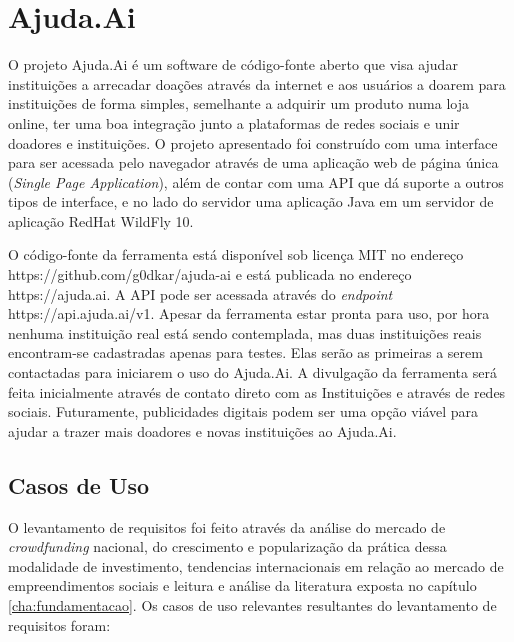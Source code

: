 \chapter{Ajuda.Ai} \label{cha:ajudaai}

O projeto Ajuda.Ai é um software de código-fonte aberto que visa ajudar instituições a arrecadar doações através da internet e aos usuários a doarem para instituições de forma simples, semelhante a adquirir um produto numa loja online, ter uma boa integração junto a plataformas de redes sociais e unir doadores e instituições. O projeto apresentado foi construído com uma interface para ser acessada pelo navegador através de uma aplicação web de página única (\emph{Single Page Application}), além de contar com uma API que dá suporte a outros tipos de interface, e no lado do servidor uma aplicação Java em um servidor de aplicação RedHat WildFly 10.

O código-fonte da ferramenta está disponível sob licença MIT no endereço \\ https://github.com/g0dkar/ajuda-ai e está publicada no endereço https://ajuda.ai. A API pode ser acessada através do \emph{endpoint} https://api.ajuda.ai/v1. Apesar da ferramenta estar pronta para uso, por hora nenhuma instituição real está sendo contemplada, mas duas instituições reais encontram-se cadastradas apenas para testes. Elas serão as primeiras a serem contactadas para iniciarem o uso do Ajuda.Ai. A divulgação da ferramenta será feita inicialmente através de contato direto com as Instituições e através de redes sociais. Futuramente, publicidades digitais podem ser uma opção viável para ajudar a trazer mais doadores e novas instituições ao Ajuda.Ai.





\section{Casos de Uso} \label{sec:ajudaai:casos}

O levantamento de requisitos foi feito através da análise do mercado de \emph{crowdfunding} nacional, do crescimento e popularização da prática dessa modalidade de investimento, tendencias internacionais em relação ao mercado de empreendimentos sociais e leitura e análise da literatura exposta no capítulo \ref{cha:fundamentacao}. Os casos de uso relevantes resultantes do levantamento de requisitos foram:


